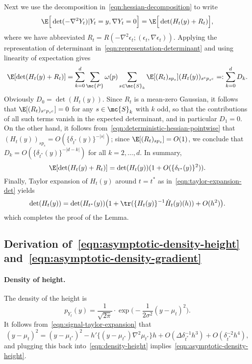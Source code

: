 \documentclass{article}
\begin{document}
	Next we use the decomposition in~\eqref{eqn:hessian-decomposition} to write
	\begin{equation*}
		\E\Big[\det(-\nabla^2 Y_t)|Y_t = y,\nabla Y_t = 0\Big] = \E\Big[\det(H_t(y) + R_t)\Big],
	\end{equation*}
	where we have abbreviated $R_t = R(-\nabla^2 \epsilon_t;(\epsilon_t,\nabla \epsilon_t))$. Applying the representation of determinant in~\eqref{eqn:representation-determinant} and using linearity of expectation gives
	\begin{align*}
		\E[\det(H_t(y) + R_t)] = \sum_{k = 0}^{d} \sum_{\mc{P}} \omega(p) \sum_{s \in \mc{S}_k} \E[(R_t)_{sp_{s}}] (H_t(y))_{s^cp_{s^c}} =: \sum_{k = 0}^{d} D_k.
	\end{align*}
	Obviously $D_0 = \det(H_t(y))$. Since $R_t$ is a mean-zero Gaussian, it follows that $\E[(R_t)_{s^cp_{s^c}}] = 0$ for any $s \in \mc{S}_k$ with $k$ odd, so that the contributions of all such terms vanish in the expected determinant, and in particular $D_1 = 0$. On the other hand, it follows from~\eqref{eqn:deterministic-hessian-pointwise} that
	$(H_t(y))_{sp_s} = O(\{\delta_{t^*}(y)\}^{-|s|})$; since $\E[(R_t)_{sp_s}] = O(1)$, we conclude that $D_k = O(\{\delta_{t^*}(y)\}^{-|d - k|})$ for all $k = 2,\ldots,d$. In summary,
	\begin{equation*}
		\E[\det(H_t(y) + R_t)] = \det(H_t(y))(1 +  O(\{\delta_{t^*}(y)\}^2)). 
	\end{equation*}
	Finally, Taylor expansion of $H_t(y)$ around $t = t^*$ as in~\eqref{eqn:taylor-expansion-det} yields
	\begin{equation*}
		\det(H_t(y)) = \det(H_{t^*}(y))\big(1 + \tr(\{H_t(y)\}^{-1} \dot{H}_t(y)(h)) + O(h^2)\big).
	\end{equation*}
	which completes the proof of the Lemma.
	
	\subsection{Derivation of~\eqref{eqn:asymptotic-density-height} and~\eqref{eqn:asymptotic-density-gradient}}
	\label{subsec:asymptotic-analysis-density}
	
	\paragraph{Density of height.}
	The density of the height is
	\begin{equation}
		\label{eqn:density-height}
		p_{Y_t}(y) = \frac{1}{\sqrt{2\pi}} \cdot \exp\Big(-\frac{1}{2\sigma^2} (y - \mu_t)^2\Big).
	\end{equation}
	It follows from~\eqref{eqn:signal-taylor-expansion} that
	\begin{equation*}
		(y - \mu_t)^2 = (y - \mu_{t^*})^2 - h'\{(y - \mu_{t^*})\nabla^2\mu_{t^*}\}h + O(\Delta \delta_{t^*}^{-1}h^3) + O(\delta_{t^*}^{-2}h^4),	
	\end{equation*}
	and plugging this back into~\eqref{eqn:density-height} implies~\eqref{eqn:asymptotic-density-height}. 
	
\end{document}
